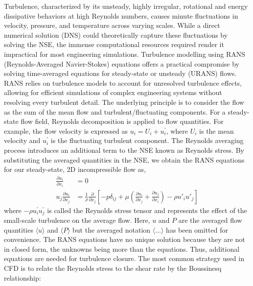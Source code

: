 Turbulence, characterized by its unsteady, highly irregular, rotational and energy dissipative behaviors at high Reynolds numbers, causes minute fluctuations in velocity, pressure, and temperature across varying scales. While a direct numerical solution (DNS) could theoretically capture these fluctuations by solving the NSE, the immense computational resources required render it impractical for most engineering simulations. 
Turbulence modelling using RANS (Reynolds-Averaged Navier-Stokes) equations offers a practical compromise by solving time-averaged equations for steady-state or unsteady (URANS) flows. RANS relies on turbulence models to account for unresolved turbulence effects, allowing for efficient simulations of complex engineering systems without resolving every turbulent detail. The underlying principle is to consider the flow as the sum of the mean flow and turbulent/fluctuating components. For a steady-state flow field, Reynolds decomposition is applied to flow quantities. For example, the flow velocity is expressed as $u_i = U_i + u_i^{\prime}$, where $U_i$ is the mean velocity and $u_i^{\prime}$ is the fluctuating turbulent component. The Reynolds averaging process introduces an additional term to the NSE known as Reynolds stress. By substituting the averaged quantities in the NSE, we obtain the RANS equations for our steady-state, 2D incompressible flow as,
\begin{equation}
  \begin{aligned}
  \frac{\partial u_i}{\partial x_i}&=0 \\
  u_j \frac{\partial u_i}{\partial x_j}&=\frac{1}{\rho}\frac{\partial}{\partial x_j}     \left[-p \delta_{i j}+\mu \left(\frac{\partial u_i}{\partial x_j}+\frac{\partial u_j}{\partial x_i}\right) - \rho u'_i u'_j \right]
  \end{aligned}
\end{equation}
where $- \rho u_i^{\prime} u_j^{\prime}$ is called the Reynolds stress tensor and represents the effect of the small-scale turbulence on the average flow. Here, $u$ and $P$ are the averaged flow quantities $\langle u \rangle $ and $\langle P \rangle $ but the averaged notation $\langle ... \rangle $ has been omitted for convenience. The RANS equations have no unique solution because they are not in closed form, the unknowns being more than the equations. Thus, additional equations are needed for turbulence closure. The most common strategy used in CFD is to relate the Reynolds stress to the shear rate by the Boussinesq relationship:
